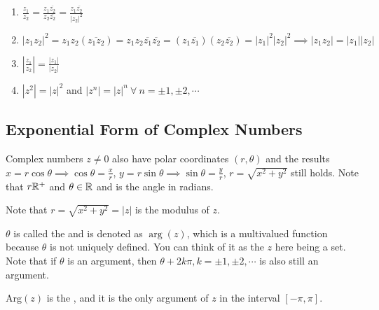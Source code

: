 \documentclass[12pt]{scrartcl}
\begin{document}
\begin{note}

  \hfill

  \begin{enumerate}
    \item $\frac{z_1}{z_2} = \frac{z_1 \overline{z_2}}{z_2 \overline{z_2}} = \frac{z_1\overline{z_2}}{|z_2|^2}$
    \item $|z_1 z_2|^2 = z_1z_2 (\overline{z_1z_2}) = z_1z_2\overline{z_1}\overline{z_2} = (z_1\overline{z_1})(z_2 \overline{z_2}) = |z_1|^2 |z_2|^2 \implies |z_1z_2| = |z_1||z_2|$
    \item $|\frac{z_1}{z_2}| = \frac{|z_1|}{|z_2|}$
    \item $|z^2| = |z|^2$ and $|z^n| = |z|^n \ \forall \ n = \pm 1, \pm 2, \cdots$
  \end{enumerate}
\end{note}

\subsection{Exponential Form of Complex Numbers}

\begin{definition}
  Complex numbers $z \neq 0$ also have polar coordinates $(r, \theta)$ and the results 
  $x = r\cos\theta \implies \cos\theta = \frac{x}{r}$, $y = r\sin\theta \implies \sin\theta = \frac{y}{r}$, $r = \sqrt{x^2 + y^2}$ still holds. 
  Note that $r \mathbb R^+$ and $\theta \in \mathbb R$ and is the angle in radians.
\end{definition}

\begin{note}
  Note that $r = \sqrt{x^2 + y^2} = |z|$ is the modulus of $z$. 
\end{note}

\begin{definition}
  $\theta$ is called the  and is denoted as $\arg(z)$, which is a multivalued function because $\theta$ is not uniquely defined. You can think of it as 
  the $z$ here being a set. Note that if 
  $\theta$ is an argument, then $\theta + 2k\pi, k = \pm 1, \pm 2, \cdots$ is also still an argument.
\end{definition}

\begin{definition}
  $\text{Arg}(z)$ is the , and it is the only argument of $z$ in the interval $[-\pi, \pi]$.
\end{definition}
\end{document}
